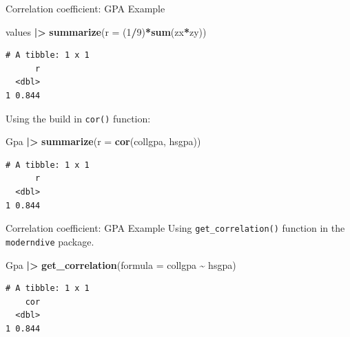 \documentclass[
  ignorenonframetext,
]{beamer}
\newenvironment{Shaded}{\begin{snugshade}}{\end{snugshade}}
\newcommand{\AttributeTok}[1]{\textcolor[rgb]{0.13,0.29,0.53}{#1}}
\newcommand{\DecValTok}[1]{\textcolor[rgb]{0.00,0.00,0.81}{#1}}
\newcommand{\FunctionTok}[1]{\textcolor[rgb]{0.13,0.29,0.53}{\textbf{#1}}}
\newcommand{\NormalTok}[1]{#1}
\newcommand{\SpecialCharTok}[1]{\textcolor[rgb]{0.81,0.36,0.00}{\textbf{#1}}}
\begin{document}
\begin{frame}[fragile]{Correlation coefficient: GPA Example}
\label{correlation-coefficient-gpa-example-1}
\normalsize

\begin{Shaded}
\begin{Highlighting}[]
\NormalTok{values }\SpecialCharTok{|\textgreater{}} 
  \FunctionTok{summarize}\NormalTok{(}\AttributeTok{r =}\NormalTok{ (}\DecValTok{1}\SpecialCharTok{/}\DecValTok{9}\NormalTok{)}\SpecialCharTok{*}\FunctionTok{sum}\NormalTok{(zx}\SpecialCharTok{*}\NormalTok{zy))}
\end{Highlighting}
\end{Shaded}

\begin{verbatim}
# A tibble: 1 x 1
      r
  <dbl>
1 0.844
\end{verbatim}

\normalsize

Using the build in \texttt{cor()} function:

\normalsize

\begin{Shaded}
\begin{Highlighting}[]
\NormalTok{Gpa }\SpecialCharTok{|\textgreater{}} 
  \FunctionTok{summarize}\NormalTok{(}\AttributeTok{r =} \FunctionTok{cor}\NormalTok{(collgpa, hsgpa))}
\end{Highlighting}
\end{Shaded}

\begin{verbatim}
# A tibble: 1 x 1
      r
  <dbl>
1 0.844
\end{verbatim}

\normalsize
\end{frame}

\begin{frame}[fragile]{Correlation coefficient: GPA Example}
\label{correlation-coefficient-gpa-example-2}
Using \texttt{get\_correlation()} function in the \texttt{moderndive}
package.

\normalsize

\begin{Shaded}
\begin{Highlighting}[]
\NormalTok{Gpa }\SpecialCharTok{|\textgreater{}} 
  \FunctionTok{get\_correlation}\NormalTok{(}\AttributeTok{formula =}\NormalTok{ collgpa }\SpecialCharTok{\textasciitilde{}}\NormalTok{ hsgpa)}
\end{Highlighting}
\end{Shaded}

\begin{verbatim}
# A tibble: 1 x 1
    cor
  <dbl>
1 0.844
\end{verbatim}

\normalsize
\end{frame}
\end{document}
